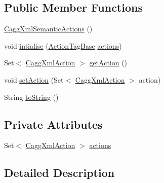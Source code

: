 \subsection*{Public Member Functions}
\begin{DoxyCompactItemize}
\item 
\hyperlink{classit_1_1emarolab_1_1cagg_1_1debugging_1_1result2XML_1_1CaggXmlSemanticActions_a2795922b81165d6abe53471ec86df793}{Cagg\-Xml\-Semantic\-Actions} ()
\item 
void \hyperlink{classit_1_1emarolab_1_1cagg_1_1debugging_1_1result2XML_1_1CaggXmlSemanticActions_ae15e96532c3a0025bebd7d460705837e}{intialise} (\hyperlink{classit_1_1emarolab_1_1cagg_1_1core_1_1evaluation_1_1semanticGrammar_1_1syntaxCompiler_1_1ActionTagBase}{Action\-Tag\-Base} \hyperlink{classit_1_1emarolab_1_1cagg_1_1debugging_1_1result2XML_1_1CaggXmlSemanticActions_a49c67afb5ef8bc2a354aa61b80b25a42}{actions})
\item 
Set$<$ \hyperlink{classit_1_1emarolab_1_1cagg_1_1debugging_1_1result2XML_1_1CaggXmlAction}{Cagg\-Xml\-Action} $>$ \hyperlink{classit_1_1emarolab_1_1cagg_1_1debugging_1_1result2XML_1_1CaggXmlSemanticActions_a7594fe0d431e4c326db8a92b16cc374e}{get\-Action} ()
\item 
void \hyperlink{classit_1_1emarolab_1_1cagg_1_1debugging_1_1result2XML_1_1CaggXmlSemanticActions_ad5f3fd16fb77ada1c0878b7b84033450}{set\-Action} (Set$<$ \hyperlink{classit_1_1emarolab_1_1cagg_1_1debugging_1_1result2XML_1_1CaggXmlAction}{Cagg\-Xml\-Action} $>$ action)
\item 
String \hyperlink{classit_1_1emarolab_1_1cagg_1_1debugging_1_1result2XML_1_1CaggXmlSemanticActions_a13be44fd433b1e6a222edb7f6b685c3d}{to\-String} ()
\end{DoxyCompactItemize}
\subsection*{Private Attributes}
\begin{DoxyCompactItemize}
\item 
Set$<$ \hyperlink{classit_1_1emarolab_1_1cagg_1_1debugging_1_1result2XML_1_1CaggXmlAction}{Cagg\-Xml\-Action} $>$ \hyperlink{classit_1_1emarolab_1_1cagg_1_1debugging_1_1result2XML_1_1CaggXmlSemanticActions_a49c67afb5ef8bc2a354aa61b80b25a42}{actions}
\end{DoxyCompactItemize}


\subsection{Detailed Description}


